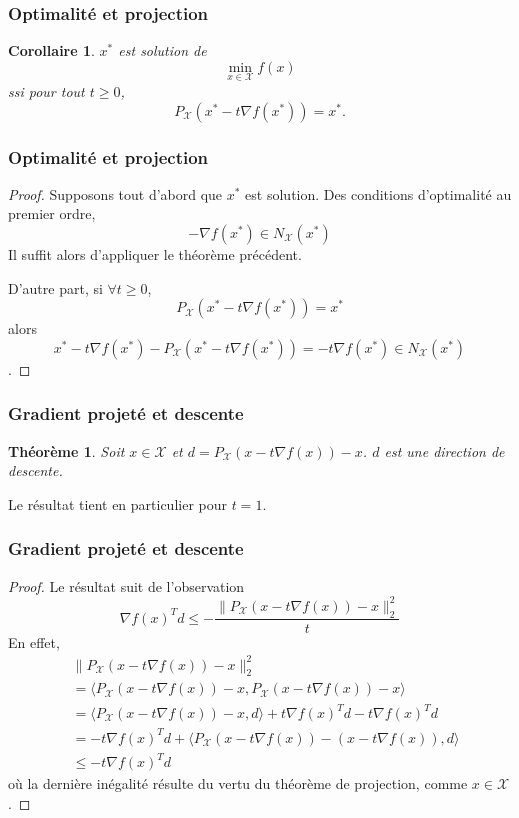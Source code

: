 \documentclass[t,usepdftitle=false]{beamer}
\newtheorem{thm}{Théorème}
\newtheorem{coro}{Corollaire}
\def\cX{\mathcal{X}}
\begin{document}
\begin{frame}
\frametitle{Optimalité et projection}

\begin{coro}
$x^*$ est solution de
$$
\min_{x \in \cX} f(x)
$$
ssi pour tout $t \geq 0$,
$$
P_{\cX}(x^* - t\nabla f(x^*)) = x^*.
$$
\end{coro}

\end{frame}

\begin{frame}
\frametitle{Optimalité et projection}

\begin{proof}
Supposons tout d'abord que $x^*$ est solution.
Des conditions d'optimalité au premier ordre, 
$$-\nabla f(x^*) \in N_{\cX}(x^*)$$
Il suffit alors d'appliquer le théorème précédent.

\mbox{}

D'autre part, si $\forall t \geq 0$,
$$
P_{\cX}(x^* - t\nabla f(x^*)) = x^*
$$
alors
$$
x^* - t\nabla f(x^*) - P_{\cX}(x^* - t\nabla f(x^*)) = -t\nabla f(x^*) \in N_{\cX}(x^*)$$.
\end{proof}

\end{frame}

\begin{frame}
\frametitle{Gradient projeté et descente}

\begin{thm}
Soit $x \in \cX$ et $d = P_{\cX}(x - t\nabla f(x)) - x$.
$d$ est une direction de descente.
\end{thm}

Le résultat tient en particulier pour $t = 1$.

\end{frame}

\begin{frame}
\frametitle{Gradient projeté et descente}

\begin{proof}
Le résultat suit de l'observation
$$
\nabla f(x)^T d
\leq -\frac{\| P_{\cX}(x - t\nabla f(x)) - x \|^2_2}{t} 
$$
En effet,
\begin{align*}
& \| P_{\cX}(x - t\nabla f(x)) - x \|^2_2 \\
& = \langle P_{\cX}(x - t\nabla f(x)) - x, P_{\cX}(x - t\nabla f(x)) - x \rangle \\
& = \langle P_{\cX}(x - t\nabla f(x)) - x, d \rangle + t\nabla f(x)^Td - t\nabla f(x)^Td \\
& = - t\nabla f(x)^Td + \langle P_{\cX}(x - t\nabla f(x)) - (x - t\nabla f(x)), d \rangle \\
& \leq - t\nabla f(x)^Td
\end{align*}
où la dernière inégalité résulte du vertu du théorème de projection, comme $x \in \cX$.
\end{proof}

\end{frame}
\end{document}
